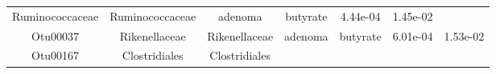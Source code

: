 \documentclass[11pt,]{article}
\begin{document}
\begin{longtable}[]{@{}ccccccc@{}}
\begin{minipage}[t]{0.17\columnwidth}
Ruminococcaceae\strut
\end{minipage} & \begin{minipage}[t]{0.17\columnwidth}\centering\strut
Ruminococcaceae\strut
\end{minipage} & \begin{minipage}[t]{0.09\columnwidth}\centering\strut
adenoma\strut
\end{minipage} & \begin{minipage}[t]{0.11\columnwidth}\centering\strut
butyrate\strut
\end{minipage} & \begin{minipage}[t]{0.09\columnwidth}\centering\strut
4.44e-04\strut
\end{minipage} & \begin{minipage}[t]{0.09\columnwidth}\centering\strut
1.45e-02\strut
\end{minipage}\tabularnewline
\begin{minipage}[t]{0.09\columnwidth}\centering\strut
Otu00037\strut
\end{minipage} & \begin{minipage}[t]{0.17\columnwidth}\centering\strut
Rikenellaceae\strut
\end{minipage} & \begin{minipage}[t]{0.17\columnwidth}\centering\strut
Rikenellaceae\strut
\end{minipage} & \begin{minipage}[t]{0.09\columnwidth}\centering\strut
adenoma\strut
\end{minipage} & \begin{minipage}[t]{0.11\columnwidth}\centering\strut
butyrate\strut
\end{minipage} & \begin{minipage}[t]{0.09\columnwidth}\centering\strut
6.01e-04\strut
\end{minipage} & \begin{minipage}[t]{0.09\columnwidth}\centering\strut
1.53e-02\strut
\end{minipage}\tabularnewline
\begin{minipage}[t]{0.09\columnwidth}\centering\strut
Otu00167\strut
\end{minipage} & \begin{minipage}[t]{0.17\columnwidth}\centering\strut
Clostridiales\strut
\end{minipage} & \begin{minipage}[t]{0.17\columnwidth}\centering\strut
Clostridiales\strut
\end{minipage} & \begin{minipage}[t]{0.09\columnwidth}\centering\strut

\end{minipage}
\end{longtable}
\end{document}
